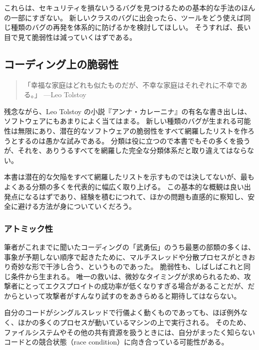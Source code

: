 \documentclass[uplatex]{jsarticle}
\begin{document}
これらは、セキュリティを損ないうるバグを見つけるための基本的な手法のほんの一部にすぎない。
新しいクラスのバグに出会ったら、ツールをどう使えば同じ種類のバグの再発を体系的に防げるかを検討してほしい。
そうすれば、長い目で見て脆弱性は減っていくはずである。

\subsection{コーディング上の脆弱性}

\begin{quote}
「幸福な家庭はどれも似たものだが、不幸な家庭はそれぞれに不幸である。」 ---Leo Tolstoy
\end{quote}

残念ながら、Leo Tolstoy の小説『アンナ・カレーニナ』の有名な書き出しは、ソフトウェアにもあまりによく当てはまる。
新しい種類のバグが生まれる可能性は無限にあり、潜在的なソフトウェアの脆弱性をすべて網羅したリストを作ろうとするのは愚かな試みである。
分類は役に立つので本書でもその多くを扱うが、それを、ありうるすべてを網羅した完全な分類体系だと取り違えてはならない。

本書は潜在的な欠陥をすべて網羅したリストを示すものでは決してないが、最もよくある分類の多くを代表的に幅広く取り上げる。
この基本的な概観は良い出発点になるはずであり、経験を積むにつれて、ほかの問題も直感的に察知し、安全に避ける方法が身についていくだろう。

\subsubsection{アトミック性}

筆者がこれまでに聞いたコーディングの「武勇伝」のうち最悪の部類の多くは、事象が予期しない順序で起きたために、マルチスレッドや分散プロセスがときおり奇妙な形で干渉し合う、というものであった。
脆弱性も、しばしばこれと同じ条件から生まれる。
唯一の救いは、微妙なタイミングが求められるため、攻撃者にとってエクスプロイトの成功率が低くなりすぎる場合があることだが、だからといって攻撃者がすんなり試すのをあきらめると期待してはならない。

自分のコードがシングルスレッドで行儀よく動くものであっても、ほぼ例外なく、ほかの多くのプロセスが動いているマシンの上で実行される。
そのため、ファイルシステムやその他の共有資源を扱うときには、自分がまったく知らないコードとの競合状態（race condition）に向き合っている可能性がある。
\end{document}
